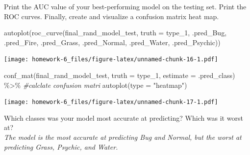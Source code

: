 \documentclass[
]{article}
\newenvironment{Shaded}{\begin{snugshade}}{\end{snugshade}}
\newcommand{\AttributeTok}[1]{\textcolor[rgb]{0.77,0.63,0.00}{#1}}
\newcommand{\CommentTok}[1]{\textcolor[rgb]{0.56,0.35,0.01}{\textit{#1}}}
\newcommand{\FunctionTok}[1]{\textcolor[rgb]{0.00,0.00,0.00}{#1}}
\newcommand{\NormalTok}[1]{#1}
\newcommand{\SpecialCharTok}[1]{\textcolor[rgb]{0.00,0.00,0.00}{#1}}
\newcommand{\StringTok}[1]{\textcolor[rgb]{0.31,0.60,0.02}{#1}}
\begin{document}
Print the AUC value of your best-performing model on the testing set.
Print the ROC curves. Finally, create and visualize a confusion matrix
heat map.

\begin{Shaded}
\begin{Highlighting}[]
 \FunctionTok{autoplot}\NormalTok{(}\FunctionTok{roc\_curve}\NormalTok{(final\_rand\_model\_test, }\AttributeTok{truth =}\NormalTok{ type\_1, .pred\_Bug, .pred\_Fire, .pred\_Grass, .pred\_Normal, .pred\_Water, .pred\_Psychic))}
\end{Highlighting}
\end{Shaded}

\texttt{[image: homework-6\_files/figure-latex/unnamed-chunk-16-1.pdf]}

\begin{Shaded}
\begin{Highlighting}[]
\FunctionTok{conf\_mat}\NormalTok{(final\_rand\_model\_test, }\AttributeTok{truth =}\NormalTok{ type\_1, }\AttributeTok{estimate =}\NormalTok{ .pred\_class) }\SpecialCharTok{\%\textgreater{}\%} \CommentTok{\#calclate confusion matri }
  \FunctionTok{autoplot}\NormalTok{(}\AttributeTok{type =} \StringTok{"heatmap"}\NormalTok{)}
\end{Highlighting}
\end{Shaded}

\texttt{[image: homework-6\_files/figure-latex/unnamed-chunk-17-1.pdf]}

Which classes was your model most accurate at predicting? Which was it
worst at?\\
\emph{The model is the most accurate at predicting Bug and Normal, but
the worst at predicting Grass, Psychic, and Water.}
\end{document}
